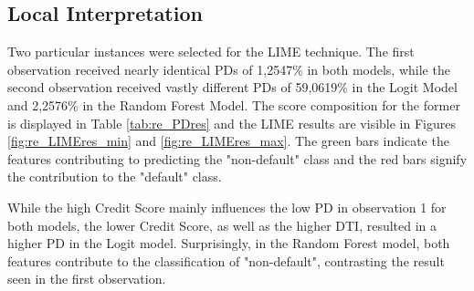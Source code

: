 \subsection{Local Interpretation}
Two particular instances were selected for the \ac{LIME} technique. The first observation received nearly identical PDs of 1,2547\% in both models, while the second observation received vastly different PDs of 59,0619\% in the Logit Model and 2,2576\% in the Random Forest Model. The score composition for the former is displayed in Table \ref{tab:re_PDres} and the \ac{LIME} results are visible in Figures \ref{fig:re_LIMEres_min} and \ref{fig:re_LIMEres_max}. The green bars indicate the features contributing to predicting the "non-default" class and the red bars signify the contribution to the "default" class. 

While the high Credit Score mainly influences the low PD in observation 1 for both models, the lower Credit Score, as well as the higher DTI, resulted in a higher PD in the Logit model. Surprisingly, in the Random Forest model, both features contribute to the classification of "non-default", contrasting the result seen in the first observation.

